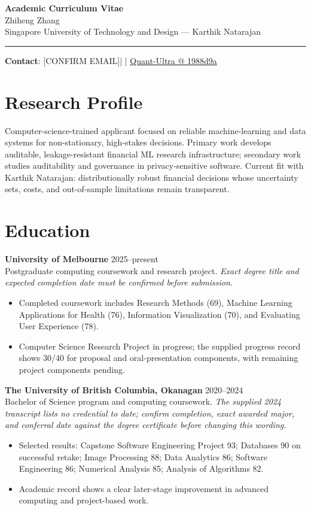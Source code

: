 \documentclass[11pt]{article}
\makeatletter
\newcommand{\ApplicantName}{Zhiheng Zhang}
\newcommand{\ApplicantEmail}{[CONFIRM EMAIL]}
\newcommand{\ApplicantPhone}{[CONFIRM PHONE]}
\newcommand{\ApplicantGitHub}{\href{https://github.com/zhiheng-zhang-Mera/Quant-Ultra/tree/1988d9a8530da91a8158de864d098ea869098923}{Quant-Ultra @ 1988d9a}}
\makeatother
\begin{document}
\begin{center}
{\LARGE\bfseries Academic Curriculum Vitae}\\[0.25em]
{\large \ApplicantName}\\
Singapore University of Technology and Design --- Karthik Natarajan
\end{center}
\vspace{0.35em}\hrule\vspace{0.65em}

\textbf{Contact}: \ApplicantEmail\quad | \quad \ApplicantPhone\quad | \quad \ApplicantGitHub

\section*{Research Profile}
Computer-science-trained applicant focused on reliable machine-learning and data systems for non-stationary, high-stakes decisions. Primary work develops auditable, leakage-resistant financial ML research infrastructure; secondary work studies auditability and governance in privacy-sensitive software. Current fit with Karthik Natarajan: distributionally robust financial decisions whose uncertainty sets, costs, and out-of-sample limitations remain transparent.

\section*{Education}
\textbf{University of Melbourne} \hfill 2025--present\\
Postgraduate computing coursework and research project. \textit{Exact degree title and expected completion date must be confirmed before submission.}
\begin{itemize}
\item Completed coursework includes Research Methods (69), Machine Learning Applications for Health (76), Information Visualization (70), and Evaluating User Experience (78).
\item Computer Science Research Project in progress; the supplied progress record shows 30/40 for proposal and oral-presentation components, with remaining project components pending.
\end{itemize}

\textbf{The University of British Columbia, Okanagan} \hfill 2020--2024\\
Bachelor of Science program and computing coursework. \textit{The supplied 2024 transcript lists no credential to date; confirm completion, exact awarded major, and conferral date against the degree certificate before changing this wording.}
\begin{itemize}
\item Selected results: Capstone Software Engineering Project 93; Databases 90 on successful retake; Image Processing 88; Data Analytics 86; Software Engineering 86; Numerical Analysis 85; Analysis of Algorithms 82.
\item Academic record shows a clear later-stage improvement in advanced computing and project-based work.
\end{itemize}
\end{document}
